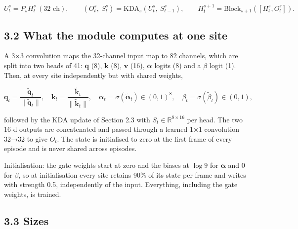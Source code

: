 \documentclass[

]{article}
\begin{document}
\[

U^s_t=P_s H^s_t\ (32\text{ ch}),\qquad (O^s_t,\ S^s_t)=\mathrm{KDA}_s(U^s_t,\ S^s_{t-1}),\qquad H^{s+1}_t=\mathrm{Block}_{s+1}([H^s_t,O^s_t]).

\]



\subsection{3.2 What the module computes at one site}\label{what-the-module-computes-at-one-site}



A 3×3 convolution maps the 32-channel input map to 82 channels, which are split into two heads of 41: \(\mathbf{q}\) (8), \(\mathbf{k}\) (8), \(\mathbf{v}\) (16), \(\boldsymbol\alpha\) logits (8) and a \(\beta\) logit (1). Then, at every site independently but with shared weights,



\[

\mathbf{q}_t=\frac{\tilde{\mathbf{q}}_t}{\|\tilde{\mathbf{q}}_t\|},\quad

\mathbf{k}_t=\frac{\tilde{\mathbf{k}}_t}{\|\tilde{\mathbf{k}}_t\|},\quad

\boldsymbol\alpha_t=\sigma(\tilde{\boldsymbol\alpha}_t)\in(0,1)^8,\quad

\beta_t=\sigma(\tilde\beta_t)\in(0,1),

\]



followed by the KDA update of Section 2.3 with \(S_t\in\mathbb{R}^{8\times16}\) per head. The two 16-d outputs are concatenated and passed through a learned 1×1 convolution 32→32 to give \(O_t\). The state is initialised to zero at the first frame of every episode and is never shared across episodes.



Initialisation: the gate weights start at zero and the biases at \(\log 9\) for \(\boldsymbol\alpha\) and \(0\) for \(\beta\), so at initialisation every site retains 90\% of its state per frame and writes with strength 0.5, independently of the input. Everything, including the gate weights, is trained.



\subsection{3.3 Sizes}\label{sizes}
\end{document}
